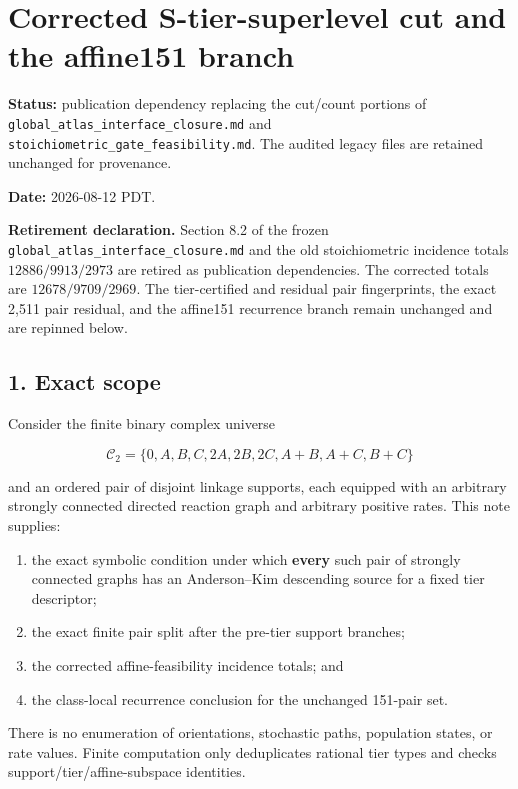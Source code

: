 \section{Corrected S-tier-superlevel cut and the affine151
branch}

\textbf{Status:} publication dependency replacing the cut/count portions
of \texttt{global\_atlas\_interface\_closure.md} and
\texttt{stoichiometric\_gate\_feasibility.md}. The audited legacy files
are retained unchanged for provenance.

\textbf{Date:} 2026-08-12 PDT.

\textbf{Retirement declaration.} Section 8.2 of the frozen
\texttt{global\_atlas\_interface\_closure.md} and the old stoichiometric
incidence totals \(12886/9913/2973\) are retired as publication
dependencies. The corrected totals are \(12678/9709/2969\). The
tier-certified and residual pair fingerprints, the exact 2,511 pair
residual, and the affine151 recurrence branch remain unchanged and are
repinned below.

\subsection{1. Exact scope}

Consider the finite binary complex universe

\[
 \mathcal C_2=\{0,A,B,C,2A,2B,2C,A+B,A+C,B+C\}
\]

and an ordered pair of disjoint linkage supports, each equipped with an
arbitrary strongly connected directed reaction graph and arbitrary
positive rates. This note supplies:

\begin{enumerate}
\def\labelenumi{\arabic{enumi}.}
\tightlist
\item
  the exact symbolic condition under which \textbf{every} such pair of
  strongly connected graphs has an Anderson--Kim descending source for a
  fixed tier descriptor;
\item
  the exact finite pair split after the pre-tier support branches;
\item
  the corrected affine-feasibility incidence totals; and
\item
  the class-local recurrence conclusion for the unchanged 151-pair set.
\end{enumerate}

There is no enumeration of orientations, stochastic paths, population
states, or rate values. Finite computation only deduplicates rational
tier types and checks support/tier/affine-subspace identities.

